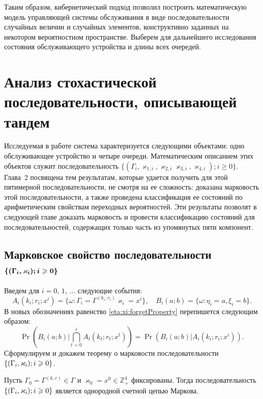 \documentclass{report}
\newcommand{\Mark}{\{(\Gamma_i, \varkappa_i); \hm{} i \geqslant 0\}}
\newcommand{\MarkThree}{\{(\Gamma_i, \varkappa_{3,i}); \hm{} i \geqslant 0\}}
\begin{document}
Таким образом, кибернетический подход позволил построить математическую модель управляющей системы обслуживания в виде последовательности случайных величин и случайных элементов, конструктивно заданных на некотором вероятностном пространстве. Выберем для дальнейшего исследования состояния обслуживающего устройства и длины всех очередей.
\newpage
\section{Анализ стохастической последовательности, описывающей тандем}
Исследуемая в работе система характеризуется следующими объектами: одно обслуживающее устройство и четыре очереди. Математическим описанием этих объектов служит последовательность 
 $\{(\Gamma_i, \varkappa_{1,i}, \varkappa_{2,i}\varkappa_{3,i},  \varkappa_{4,i}); i \geqslant 0\}$. Глава~2 посвящена тем результатам, которые удается получить для этой пятимерной последовательности, не смотря на ее сложность: доказана марковость этой последовательности, а также проведена классификация ее состояний по арифметическим свойствам переходных вероятностей. Эти результаты позволят в следующей главе доказать марковость и провести классификацию состояний для последовательностей, содержащих только часть из упомянутых пяти компонент.
 
\subsection[Марковское свойство последовательности ${\Mark}$]%
{Марковское свойство последовательности $\boldsymbol{\Mark}$}


Введем для $i=0$, $1$, $\ldots$ следующие события:
\begin{equation*}
A_i(k_i;r_i;x^i) = \{\omega\colon\Gamma_i=\Gamma^{(k_i,r_i)}\varkappa_i=x^i\}, \quad  B_i(a;b) = \{\omega\colon\eta_i=a, \xi_i=b\}.
\end{equation*}
В новых обозначениях равенство \eqref{eta:xi:forgetProperty}  перепишется следующим образом:
\begin{equation}
\Pr (B_i(a;b) | \bigcap_{t=0}^{i} A_t(k_t;r_t;x^t)) = \Pr (B_i(a;b) |  A_i(k_i;r_i;x^i)).
\label{new:notation:eta:xi:forget}
\end{equation}
Сформулируем и докажем теорему о марковости последовательности $\Mark$.
\begin{theorem}
Пусть $\Gamma_0=\Gamma^{(k,r)}\in \Gamma$ и $\varkappa_0=x^0\in \mathbb{Z}_+^4$ фиксированы. Тогда последовательность $\Mark$ является однородной счетной цепью Маркова. 
\end{theorem}
\end{document}
